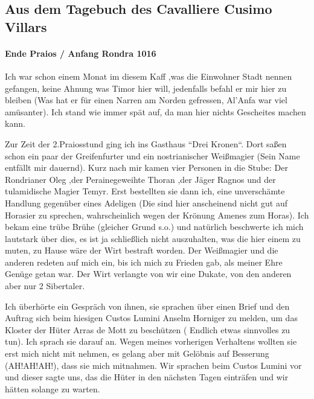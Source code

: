 \documentclass[11pt]{scrreprt}
\begin{document}
\subsection{Aus dem Tagebuch des Cavalliere Cusimo Villars}

\paragraph{Ende Praios / Anfang Rondra 1016}
Ich war schon einem Monat im diesem Kaff ,was die Einwohner Stadt nennen gefangen, keine Ahnung was Timor hier will, jedenfalls befahl er mir hier zu bleiben (Was hat er für einen Narren am Norden gefressen, Al'Anfa war viel amüsanter).
Ich stand wie immer spät auf, da man hier nichts Gescheites machen kann.\par
Zur Zeit der 2.Praiosstund ging ich ins Gasthaus “Drei Kronen“. Dort saßen schon ein paar der Greifenfurter und ein nostrianischer Weißmagier (Sein Name entfällt mir dauernd). Kurz nach mir kamen vier Personen in die Stube: Der Rondrianer Oleg ,der Perainegeweihte Thoran ,der Jäger Ragnos und der tulamidische Magier Temyr. Erst bestellten sie dann ich, eine unverschämte Handlung gegenüber eines Adeligen (Die sind hier anscheinend nicht gut auf Horasier zu sprechen, wahrscheinlich wegen der Krönung Amenes zum Horas). Ich bekam eine trübe Brühe (gleicher Grund s.o.) und natürlich beschwerte ich mich lautstark über dies, es ist ja schließlich nicht auszuhalten, was die hier einem zu muten, zu Hause wäre der Wirt bestraft worden. Der Weißmagier und die anderen redeten auf mich ein, bis ich mich zu Frieden gab, als meiner Ehre Genüge getan war. Der Wirt verlangte von wir eine Dukate, von den anderen aber nur 2 Sibertaler.\par
Ich überhörte ein Gespräch von ihnen, sie sprachen über einen Brief und den Auftrag sich beim hiesigen Custos Lumini Anselm Horniger zu melden, um das Kloster der Hüter Arras de Mott zu beschützen ( Endlich etwas sinnvolles zu tun). Ich sprach sie darauf an. Wegen meines vorherigen Verhaltens wollten sie erst mich nicht mit nehmen, es gelang aber mit Gelöbnis auf Besserung (AH!AH!AH!), dass sie mich mitnahmen. Wir sprachen beim Custos Lumini vor und dieser sagte uns, das die Hüter in den nächsten Tagen einträfen und wir hätten solange zu warten.\par
\end{document}
